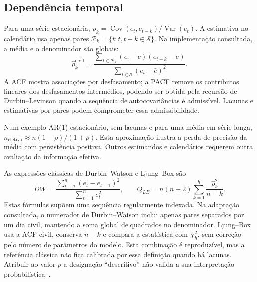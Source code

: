 \subsection{Dependência temporal}
\label{sec:mat-acf}
Para uma série estacionária, $\rho_k=\operatorname{Cov}(e_t,e_{t-k})/\operatorname{Var}(e_t)$. A estimativa no calendário usa apenas pares $\mathcal P_k=\{t:t,t-k\in\mathcal S\}$. Na implementação consultada, a média e o denominador são globais:
\begin{equation}
\widehat\rho_k^{\mathrm{civil}}=
\frac{\sum_{t\in\mathcal P_k}(e_t-\bar e)(e_{t-k}-\bar e)}
{\sum_{t\in\mathcal S}(e_t-\bar e)^2}.
\label{eq:mat-acf-civil}
\end{equation}
A ACF mostra associações por desfasamento; a PACF remove os contributos lineares dos desfasamentos intermédios, podendo ser obtida pela recursão de Durbin--Levinson quando a sequência de autocovariâncias é admissível. Lacunas e estimativas por pares podem comprometer essa admissibilidade.

Num exemplo AR(1) estacionário, sem lacunas e para uma média em série longa, $n_{\mathrm{efetivo}}\approx n(1-\rho)/(1+\rho)$. Esta aproximação ilustra a perda de precisão da média com persistência positiva. Outros estimandos e calendários requerem outra avaliação da informação efetiva.

As expressões clássicas de
Durbin--Watson e
Ljung--Box são
\begin{equation}
DW=\frac{\sum_{t=2}^{n}(e_t-e_{t-1})^2}{\sum_{t=1}^{n}e_t^2},
\qquad Q_{LB}=n(n+2)\sum_{k=1}^{h}\frac{\widehat\rho_k^2}{n-k}.
\label{eq:mat-dw-lb}
\end{equation}
Estas fórmulas supõem uma sequência regularmente indexada. Na adaptação consultada, o numerador de Durbin--Watson inclui apenas pares separados por um dia civil, mantendo a soma global de quadrados no denominador. Ljung--Box usa a ACF civil, conserva $n-k$ e compara a estatística com $\chi^2_h$, sem correção pelo número de parâmetros do modelo. Esta combinação é reproduzível, mas a referência clássica não fica calibrada por essa definição quando há lacunas. Atribuir ao valor $p$ a designação ``descritivo'' não valida a sua interpretação probabilística~\parencite{BoxJenkins2015}.

